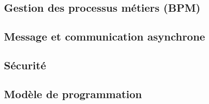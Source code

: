 \subsection{Gestion des processus métiers (BPM)}

\subsection{Message et communication asynchrone}

\subsection{Sécurité}
\subsection{Modèle de programmation}

